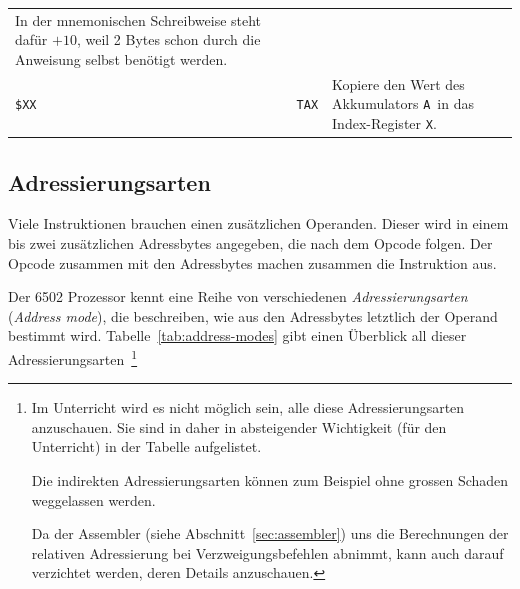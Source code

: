 \documentclass[11pt]{scrartcl}
\newcommand{\xreg}{\texttt{X}}
\newcommand{\acc}{\texttt{A}}
\begin{document}
\begin{longtable}{@{}llp{10cm}@{}}
                                                In der mnemonischen
                                                Schreibweise steht
                                                dafür $+10$, weil 2
                                                Bytes schon durch die
                                                Anweisung selbst
                                                benötigt werden.\\
    \lstinline!$XX! & \lstinline!TAX! & Kopiere den Wert des
                                        Akkumulators \acc\ in das
                                        Index-Register \xreg. \\
    \bottomrule
  \end{longtable}


\subsection{Adressierungsarten}
\label{sec:address_modes}

Viele Instruktionen brauchen einen zusätzlichen Operanden. Dieser wird
in einem bis zwei zusätzlichen Adressbytes angegeben, die nach dem Opcode
folgen. Der Opcode zusammen mit den Adressbytes machen zusammen die
Instruktion aus.   

Der 6502 Prozessor kennt eine Reihe von verschiedenen
\emph{Adressierungsarten} (\emph{Address mode}), die beschreiben, wie
aus den Adressbytes letztlich der Operand bestimmt wird.
Tabelle~\ref{tab:address-modes} gibt einen Überblick all dieser
Adressierungsarten~\footnote{Im Unterricht wird es nicht möglich
  sein, alle diese Adressierungsarten anzuschauen.  Sie sind in daher
  in absteigender Wichtigkeit (für den Unterricht) in der Tabelle
  aufgelistet.

  Die indirekten Adressierungsarten können zum Beispiel ohne grossen
  Schaden weggelassen werden.

  Da der Assembler (siehe Abschnitt~\ref{sec:assembler}) uns die
  Berechnungen der relativen Adressierung bei Verzweigungsbefehlen
  abnimmt, kann auch darauf verzichtet werden, deren Details
  anzuschauen.}
  
\end{document}
